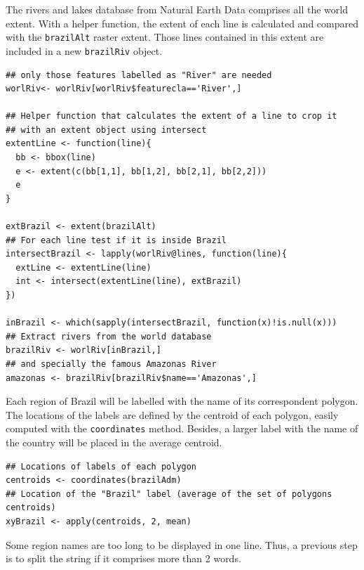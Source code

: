The rivers and lakes database from Natural Earth Data comprises
all the world extent. With a helper function, the extent of each
line is calculated and compared with the \texttt{brazilAlt} raster
extent. Those lines contained in this extent are included in a new
\texttt{brazilRiv} object. 

\lstset{language=R}
\begin{lstlisting}
## only those features labelled as "River" are needed
worlRiv<- worlRiv[worlRiv$featurecla=='River',]

## Helper function that calculates the extent of a line to crop it
## with an extent object using intersect
extentLine <- function(line){
  bb <- bbox(line)
  e <- extent(c(bb[1,1], bb[1,2], bb[2,1], bb[2,2]))
  e
}

extBrazil <- extent(brazilAlt)
## For each line test if it is inside Brazil
intersectBrazil <- lapply(worlRiv@lines, function(line){
  extLine <- extentLine(line)
  int <- intersect(extentLine(line), extBrazil)
})

inBrazil <- which(sapply(intersectBrazil, function(x)!is.null(x)))
## Extract rivers from the world database
brazilRiv <- worlRiv[inBrazil,]
## and specially the famous Amazonas River
amazonas <- brazilRiv[brazilRiv$name=='Amazonas',]
\end{lstlisting}



Each region of Brazil will be labelled with the name of its
correspondent polygon. The locations of the labels are defined by the
centroid of each polygon, easily computed with the \texttt{coordinates}
method. Besides, a larger label with the name of the country will be
placed in the average centroid.


\lstset{language=R}
\begin{lstlisting}
## Locations of labels of each polygon
centroids <- coordinates(brazilAdm)
## Location of the "Brazil" label (average of the set of polygons centroids)
xyBrazil <- apply(centroids, 2, mean)
\end{lstlisting}

Some region names are too long to be displayed in one line. Thus, a
previous step is to split the string if it comprises more than 2
words.

